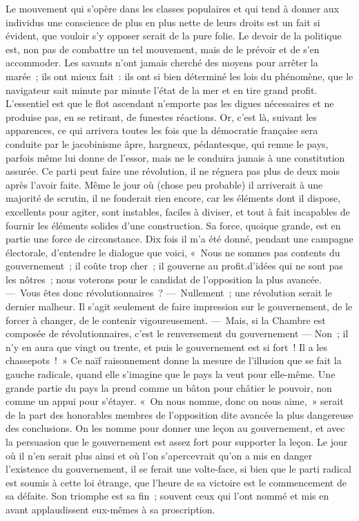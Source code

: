 \documentclass[french,twoside]{book} %
\begin{document}
Le mouvement qui s’opère dans les classes populaires et qui tend à donner aux individus une conscience de plus en plus nette de leurs droits est un fait si évident, que vouloir s’y opposer serait de la pure folie. Le devoir de la politique est, non pas de combattre un tel mouvement, mais de le prévoir et de s’en accommoder. Les savants n’ont jamais cherché des moyens pour arrêter la marée ; ils ont mieux fait : ils ont si bien déterminé les lois du phénomène, que le navigateur sait minute par minute l’état de la mer et en tire grand profit. L’essentiel est que le flot ascendant n’emporte pas les digues nécessaires et ne produise pas, en se retirant, de funestes réactions. Or, c’est là, suivant les apparences, ce qui arrivera toutes les fois que la démocratie française sera conduite par le jacobinisme âpre, hargneux, pédantesque, qui remue le pays, parfois même lui donne de l’essor, mais ne le conduira jamais à une constitution assurée. Ce parti peut faire une révolution, il ne régnera pas plus de deux mois après l’avoir faite. Même le jour où (chose peu probable) il arriverait à une majorité de scrutin, il ne fonderait rien encore, car les éléments dont il dispose, excellents pour agiter, sont instables, faciles à diviser, et tout à fait incapables de fournir les éléments solides d’une construction. Sa force, quoique grande, est en partie une force de circonstance. Dix fois il m’a été donné, pendant une campagne électorale, d’entendre le dialogue que voici, « Nous ne sommes pas contents du gouvernement ; il coûte trop cher ; il gouverne au profit.d’idées qui ne sont pas les nôtres ; nous voterons pour le candidat de l’opposition la plus avancée. — Vous êtes donc révolutionnaires ? — Nullement ; une révolution serait le dernier malheur. Il s’agit seulement de faire impression sur le gouvernement, de le forcer à changer, de le contenir vigoureusement. — Mais, si la Chambre est composée de révolutionnaires, c’est le renversement du gouvernement — Non ; il n’y en aura que vingt ou trente, et puis le gouvernement est si fort ! Il a les chassepots ! » Ce naïf raisonnement donne la mesure de l’illusion que se fait la gauche radicale, quand elle s’imagine que le pays la veut pour elle-même. Une grande partie du pays la prend comme un bâton pour châtier le pouvoir, non comme un appui pour s’étayer. « On nous nomme, donc on nous aime, » serait de la part des honorables membres de l’opposition dite avancée la plus dangereuse des conclusions. On les nomme pour donner une leçon au gouvernement, et avec la persuasion que le gouvernement est assez fort pour supporter la leçon. Le jour où il n’en serait plus ainsi et où l’on s’apercevrait qu’on a mis en danger l’existence du gouvernement, il se ferait une volte-face, si bien que le parti radical est soumis à cette loi étrange, que l’heure de sa victoire est le commencement de sa défaite. Son triomphe est sa fin ; souvent ceux qui l’ont nommé et mis en avant applaudissent eux-mêmes à sa proscription.\par
\end{document}

